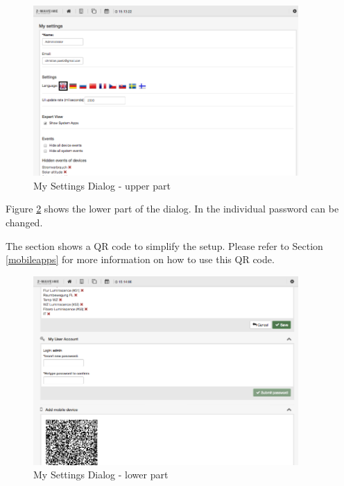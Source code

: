 \begin{figure}
\begin{center}
\includegraphics[width=0.9\textwidth]{pngs/cap4/device4.png}
\caption{My Settings Dialog - upper part}
\label{device4}
\end{center}
\end{figure}

Figure \ref{device5} shows the lower part of the  dialog. In  
the individual password can be changed.

The section  shows a QR code to simplify the setup. Please refer to 
Section \ref{mobileapps} for more information on how to use this QR code.


\begin{figure}
\begin{center}
\includegraphics[width=0.9\textwidth]{pngs/cap4/device5.png}
\caption{My Settings Dialog - lower part}
\label{device5}
\end{center}
\end{figure}


